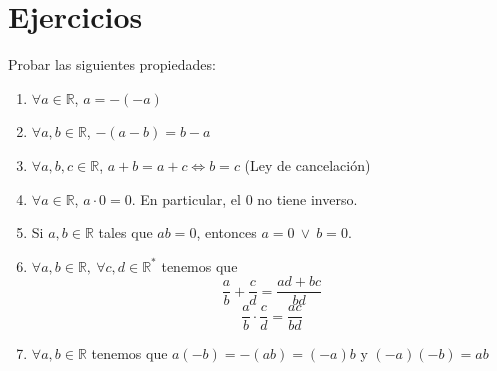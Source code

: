 \section{Ejercicios}
\begin{ejercicio}\label{ej:1.4.1}
    Probar las siguientes propiedades:
    \begin{enumerate}
        \item $\forall a \in \mathbb{R}$, $a = -(-a)$
        
        \item $\forall a,b \in \mathbb{R}$, $-(a-b)=b-a$
        
        \item $\forall a,b,c \in \mathbb{R}$, $a+b=a+c \Longleftrightarrow b=c$ (Ley de cancelación)
        
        \item $\forall a \in \mathbb{R}$, $a \cdot 0=0$. En particular, el $0$ no tiene inverso.
        
        \item Si $a,b \in \mathbb{R}$ tales que $ab=0$, entonces $a = 0 ~\lor~ b = 0$.
        
        \item \label{ej:1.4.1_6} $\forall a,b \in \mathbb{R}, ~\forall c,d \in \mathbb{R}^{*}$ tenemos que
        \begin{equation*}
            \frac{a}{b}+\frac{c}{d}=\frac{ad+bc}{bd}
        \end{equation*}
        \begin{equation*}
            \frac{a}{b} \cdot \frac{c}{d}=\frac{ac}{bd}
        \end{equation*}
        
        \item $\forall a,b \in \mathbb{R}$ tenemos que $a(-b)=-(ab)=(-a)b$ y $(-a)(-b)=ab$
    \end{enumerate}
    
    \vspace{0.5cm}
\end{ejercicio}


